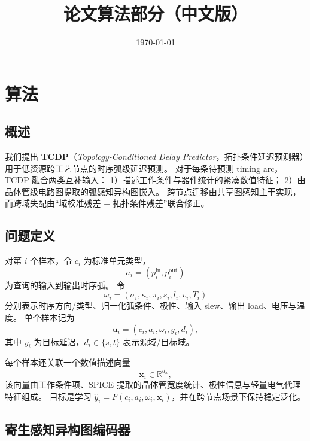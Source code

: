 ﻿\documentclass[10pt,a4paper]{ctexart}
\title{论文算法部分（中文版）}
\author{}
\date{\today}
\begin{document}
\maketitle

\section{算法}
\label{sec:algorithm_cn}

\subsection{概述}

我们提出 \textbf{TCDP}（\textit{Topology-Conditioned Delay Predictor}，拓扑条件延迟预测器）用于低资源跨工艺节点的时序弧级延迟预测。
对于每条待预测 timing arc，TCDP 融合两类互补输入：
1）描述工作条件与器件统计的紧凑数值特征；
2）由晶体管级电路图提取的弧感知异构图嵌入。
跨节点迁移由共享图感知主干实现，而跨域失配由“域校准残差 + 拓扑条件残差”联合修正。

\subsection{问题定义}

对第 $i$ 个样本，令 $c_i$ 为标准单元类型，
\begin{equation}
a_i = \left(p_i^{\mathrm{in}}, p_i^{\mathrm{out}}\right)
\end{equation}
为查询的输入到输出时序弧。
令
\begin{equation}
\omega_i = \left(\sigma_i,\kappa_i,\pi_i,s_i,l_i,v_i,T_i\right)
\end{equation}
分别表示时序方向/类型、归一化弧条件、极性、输入 slew、输出 load、电压与温度。
单个样本记为
\begin{equation}
\mathbf{u}_i = \left(c_i, a_i, \omega_i, y_i, d_i\right),
\end{equation}
其中 $y_i$ 为目标延迟，$d_i\in\{s,t\}$ 表示源域/目标域。

每个样本还关联一个数值描述向量
\begin{equation}
\mathbf{x}_i \in \mathbb{R}^{d_x},
\end{equation}
该向量由工作条件项、SPICE 提取的晶体管宽度统计、极性信息与轻量电气代理特征组成。
目标是学习 $\hat y_i = F(c_i,a_i,\omega_i,\mathbf{x}_i)$，并在跨节点场景下保持稳定泛化。

\subsection{寄生感知异构图编码器}
\end{document}

